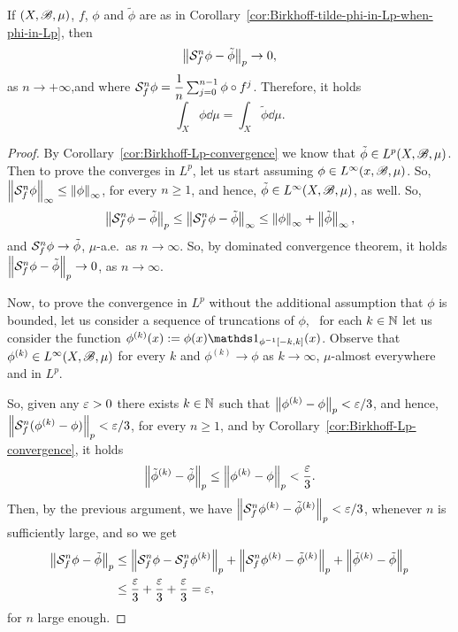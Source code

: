 \begin{corollary}\label{cor:Birkhoff-Lp-convergence}
  If $(X,\mathscr{B},\mu)$,  $f$, $\phi$ and $\tilde\phi$ are as in Corollary~\ref{cor:Birkhoff-tilde-phi-in-Lp-when-phi-in-Lp}, then
  \begin{displaymath}
    \left\|{\mathcal{S}_{f}^{n}\phi-\tilde\phi}\right\|_{p}\to 0,
  \end{displaymath}
  as $n\to+\infty$,and where  $\mathcal{S}_{f}^{n}\phi=\dfrac{1}{n}\sum_{j=0}^{n-1}\phi\circ f^{j}$. Therefore, it holds
  \begin{displaymath}
    \int_{X}\phi\dd\mu=\int_{X}\tilde\phi\dd\mu.
  \end{displaymath}
\end{corollary}

\begin{proof}
  By Corollary~\ref{cor:Birkhoff-Lp-convergence} we know that $\tilde\phi\in L^{p}(X,\mathscr{B},\mu)$.
  Then to prove the converges in $L^{p}$, let us start assuming $\phi\in L^{\infty}(x,\mathscr{B},\mu)$. So, $\left\|{\mathcal{S}_{f}^{n}\phi}\right\|_{\infty}\leq\left\|{\phi}\right\|_{\infty}$, for every $n\geq 1$, and hence, $\tilde\phi\in L^{\infty}(X,\mathscr{B},\mu)$, as well. So,
  \begin{displaymath}
    \left\|{\mathcal{S}_{f}^{n}\phi-\tilde\phi}\right\|_{p}\leq \left\|{\mathcal{S}_{f}^{n}\phi-\tilde\phi}\right\|_{\infty} \leq\left\|{\phi}\right\|_{\infty}+\left\|{\tilde\phi}\right\|_{\infty},
  \end{displaymath}
  and $\mathcal{S}_{f}^{n}\phi\to\tilde\phi$, $\mu$-a.e.~as $n\to\infty$. So, by dominated convergence theorem, it holds $\left\|{\mathcal{S}_{f}^{n}\phi-\tilde\phi}\right\|_{p}\to 0$, as $n\to\infty$.

  Now, to prove the convergence in $L^{p}$ without the additional assumption that $\phi$ is bounded, let us consider a sequence of truncations of $\phi$, \ie~for each $k\in\mathbb{N}$ let us consider the function $\phi^{(k)}(x):=\phi(x)\ds{1}_{\phi^{-1}[-k,k]}(x)$. Observe that $\phi^{(k)}\in L^{\infty}(X,\mathscr{B},\mu)$ for every $k$ and $\phi^{(k)}\to\phi$ as $k\to\infty$, $\mu$-almost everywhere and in $L^{p}$.

  So, given any $\varepsilon>0$ there exists $k\in\mathbb{N}$ such that $\left\|{\phi^{(k)}-\phi}\right\|_{p}<\varepsilon/3$, and hence,  $\left\|{\mathcal{S}_{f}^{n}(\phi^{(k)}-\phi)}\right\|_{p}<\varepsilon/3$, for every $n\geq 1$, and by Corollary~\ref{cor:Birkhoff-Lp-convergence}, it holds
  \begin{displaymath}
    \left\|{\tilde\phi^{(k)}-\tilde\phi}\right\|_{p}\leq \left\|{\phi^{(k)}-\phi}\right\|_{p}<\frac{\varepsilon}{3}.
  \end{displaymath}
  Then, by the previous argument, we have $\left\|{\mathcal{S}_{f}^{n}\phi^{(k)}-\tilde\phi^{(k)}}\right\|_{p}<\varepsilon/3$, whenever $n$ is sufficiently large, and so we get
  \begin{displaymath}
    \begin{split}
      \left\|{\mathcal{S}_{f}^{n}\phi-\tilde\phi}\right\|_{p} &\leq \left\|{\mathcal{S}_{f}^{n}\phi - \mathcal{S}_{f}^{n}\phi^{(k)}}\right\|_{p}+\left\|{\mathcal{S}_{f}^{n}\phi^{(k)}-\tilde\phi^{(k)}}\right\|_{p}  + \left\|{\tilde\phi^{(k)}-\tilde\phi}\right\|_{p}\\
      &\leq \frac{\varepsilon}{3} + \frac{\varepsilon}{3} + \frac{\varepsilon}{3} = \varepsilon,
    \end{split}
  \end{displaymath}
  for $n$ large enough.


\end{proof}
